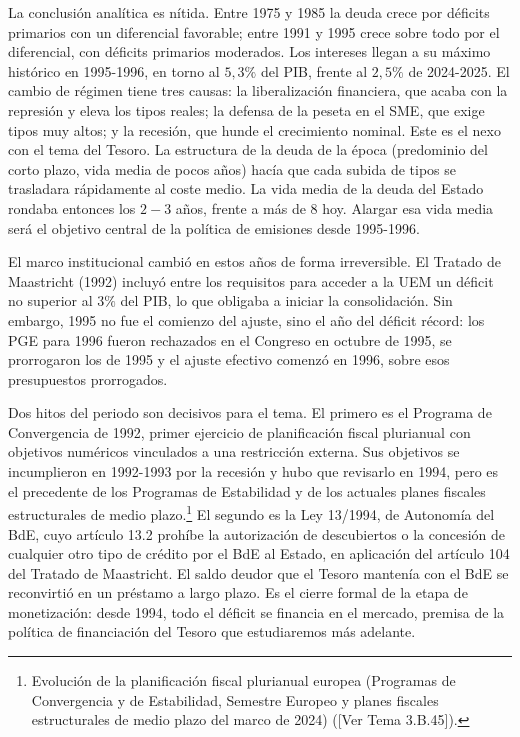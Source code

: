 \documentclass[10pt,a4paper]{article}
\newcommand{\authorfont}[1]{{\fontfamily{EBGaramond-TLF}\selectfont #1}}
\begin{document}
La conclusión analítica es nítida. Entre 1975 y 1985 la deuda crece por déficits primarios con un diferencial favorable; entre 1991 y 1995 crece sobre todo por el diferencial, con déficits primarios moderados. Los intereses llegan a su máximo histórico en 1995-1996, en torno al $5,3\%$ del PIB, frente al $2,5\%$ de 2024-2025. El cambio de régimen tiene tres causas: la liberalización financiera, que acaba con la represión y eleva los tipos reales; la defensa de la peseta en el SME, que exige tipos muy altos; y la recesión, que hunde el crecimiento nominal. Este es el nexo con el tema del Tesoro. La estructura de la deuda de la época (predominio del corto plazo, vida media de pocos años) hacía que cada subida de tipos se trasladara rápidamente al coste medio. La vida media de la deuda del Estado rondaba entonces los $2-3$ años, frente a más de $8$ hoy. Alargar esa vida media será el objetivo central de la política de emisiones desde 1995-1996.

El marco institucional cambió en estos años de forma irreversible. El Tratado de Maastricht (1992) incluyó entre los requisitos para acceder a la UEM un déficit no superior al $3\%$ del PIB, lo que obligaba a iniciar la consolidación. Sin embargo, 1995 no fue el comienzo del ajuste, sino el año del déficit récord: los PGE para 1996 fueron rechazados en el Congreso en octubre de 1995, se prorrogaron los de 1995 y el ajuste efectivo comenzó en 1996, sobre esos presupuestos prorrogados.

Dos hitos del periodo son decisivos para el tema. El primero es el Programa de Convergencia de 1992, primer ejercicio de planificación fiscal plurianual con objetivos numéricos vinculados a una restricción externa. Sus objetivos se incumplieron en 1992-1993 por la recesión y hubo que revisarlo en 1994, pero es el precedente de los Programas de Estabilidad y de los actuales planes fiscales estructurales de medio plazo.\footnote{%
    Evolución de la planificación fiscal plurianual europea (Programas de Convergencia y de Estabilidad, Semestre Europeo y planes fiscales estructurales de medio plazo del marco de 2024) ([\authorfont{Ver Tema 3.B.45}]).
} El segundo es la Ley 13/1994, de Autonomía del BdE, cuyo artículo 13.2 prohíbe la autorización de descubiertos o la concesión de cualquier otro tipo de crédito por el BdE al Estado, en aplicación del artículo 104 del Tratado de Maastricht. El saldo deudor que el Tesoro mantenía con el BdE se reconvirtió en un préstamo a largo plazo. Es el cierre formal de la etapa de monetización: desde 1994, todo el déficit se financia en el mercado, premisa de la política de financiación del Tesoro que estudiaremos más adelante.
\end{document}
